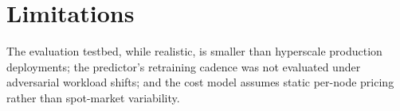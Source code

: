 \section{Limitations}
The evaluation testbed, while realistic, is smaller than hyperscale production deployments; the predictor's retraining cadence was not evaluated under adversarial workload shifts; and the cost model assumes static per-node pricing rather than spot-market variability.

